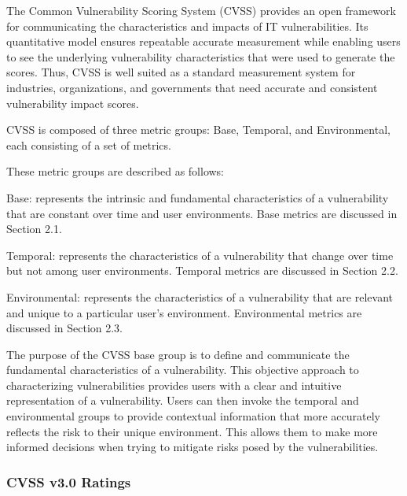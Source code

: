     The Common Vulnerability Scoring System (CVSS) provides an open
    framework for communicating the characteristics and impacts of IT
    vulnerabilities. Its quantitative model ensures repeatable accurate
    measurement while enabling users to see the underlying vulnerability
    characteristics that were used to generate the scores. Thus, CVSS is
    well suited as a standard measurement system for industries,
    organizations, and governments that need accurate and consistent
    vulnerability impact scores.

    CVSS is composed of three metric groups: Base, Temporal, and
    Environmental, each consisting of a set of metrics.

    These metric groups are described as follows:

    Base: represents the intrinsic and fundamental characteristics of a
    vulnerability that are constant over time and user environments. Base
    metrics are discussed in Section 2.1.

    Temporal: represents the characteristics of a vulnerability that change
    over time but not among user environments. Temporal metrics are
    discussed in Section 2.2.

    Environmental: represents the characteristics of a vulnerability that
    are relevant and unique to a particular user's environment.
    Environmental metrics are discussed in Section 2.3.

    The purpose of the CVSS base group is to define and communicate the
    fundamental characteristics of a vulnerability. This objective approach
    to characterizing vulnerabilities provides users with a clear and
    intuitive representation of a vulnerability. Users can then invoke the
    temporal and environmental groups to provide contextual information that
    more accurately reflects the risk to their unique environment. This
    allows them to make more informed decisions when trying to mitigate
    risks posed by the vulnerabilities.

    \subsubsection{CVSS v3.0 Ratings}\label{subsec:cvss-v3.0-ratings}

